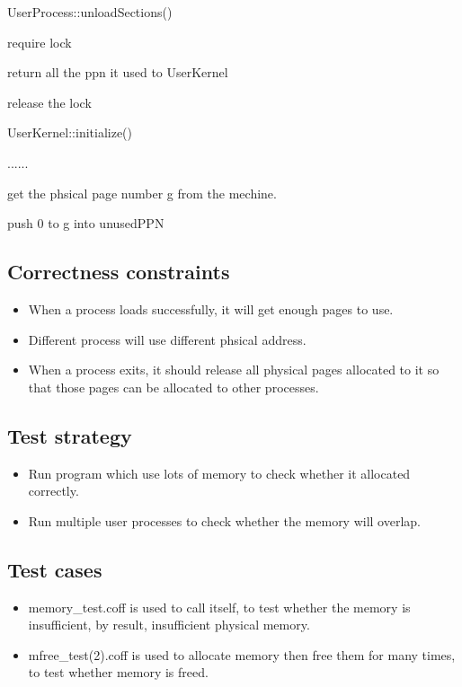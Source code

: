 \documentclass[a4paper,10pt]{article}
\begin{document}
\begin{algorithm}
\caption{UserProcess::unloadSections()}
require lock\;

return all the ppn it used to UserKernel\;

release the lock\;

\end{algorithm}

\begin{algorithm}
\caption{UserKernel::initialize()}

......\;

get the phsical page number g from the mechine.

push 0 to g into unusedPPN\;

\end{algorithm}


\subsection{Correctness constraints}

\begin{itemize}
\item When a process loads successfully, it will get enough pages to use.
\item Different process will use different phsical address.
\item When a process exits, it should release all physical pages allocated to it so that those pages can be allocated to other processes.
\end{itemize}


\subsection{Test strategy}

\begin{itemize}
\item Run program which use lots of memory to check whether it allocated correctly.
\item Run multiple user processes to check whether the memory will overlap.
\end{itemize}

\subsection{Test cases}
\begin{itemize}
\item memory\_test.coff is used to call itself, to test whether the memory is insufficient, by result, insufficient physical memory.
\item mfree\_test(2).coff is used to allocate memory then free them for many times, to test whether memory is freed.
\end{itemize}
\end{document}
